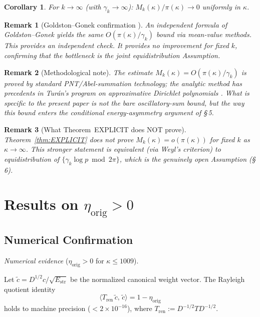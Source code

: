 \documentclass[11pt]{article}
\newtheorem{corollary}[theorem]{Corollary}
\newtheorem*{remark}{Remark}
\newcommand{\Estr}{E_{\mathrm{str}}}
\newcommand{\etaorig}{\eta_{\mathrm{orig}}}
\newcommand{\Tren}{T_{\mathrm{ren}}}
\begin{document}
\begin{corollary}
For $k\to\infty$ (with $\gamma_k\to\infty$):
$M_k(\kappa)/\pi(\kappa)\to 0$ uniformly in $\kappa$.
\end{corollary}

\begin{remark}[Goldston--Gonek confirmation \cite{GoldstonGonek}]
An independent formula of Goldston--Gonek yields the same
$O(\pi(\kappa)/\gamma_k)$ bound via mean-value methods.
This provides an independent check.
It provides no improvement for fixed $k$, confirming that the bottleneck
is the joint equidistribution Assumption.
\end{remark}

\begin{remark}[Methodological note]
The estimate $M_k(\kappa)=O(\pi(\kappa)/\gamma_k)$ is proved
by standard PNT/Abel-summation technology; the analytic method
has precedents in Tur\'an's program on approximative Dirichlet
polynomials \cite{Turan}.
What is specific to the present paper is not the bare
oscillatory-sum bound, but the way this bound enters the
conditional energy-asymmetry argument of \S\,5.
\end{remark}

\begin{remark}[What Theorem~EXPLICIT does NOT prove]
Theorem~\ref{thm:EXPLICIT} does not prove
$M_k(\kappa) = o(\pi(\kappa))$ for \emph{fixed} $k$ as $\kappa\to\infty$.
This stronger statement is equivalent (via Weyl's criterion)
to equidistribution of $\{\gamma_k\log p\bmod 2\pi\}$,
which is the genuinely open Assumption (\S\,6).
\end{remark}

\section{Results on $\etaorig > 0$}

\subsection{Numerical Confirmation}

\emph{Numerical evidence} ($\etaorig > 0$ for $\kappa\leq 1009$).

Let $\tilde{c} = D^{1/2}c/\sqrt{\Estr}$ be the normalized canonical
weight vector. The Rayleigh quotient identity
\[
\langle\Tren\,\tilde{c},\,\tilde{c}\rangle = 1 - \etaorig
\]
holds to machine precision ($< 2\times 10^{-16}$),
where $\Tren := D^{-1/2}TD^{-1/2}$.
\end{document}
